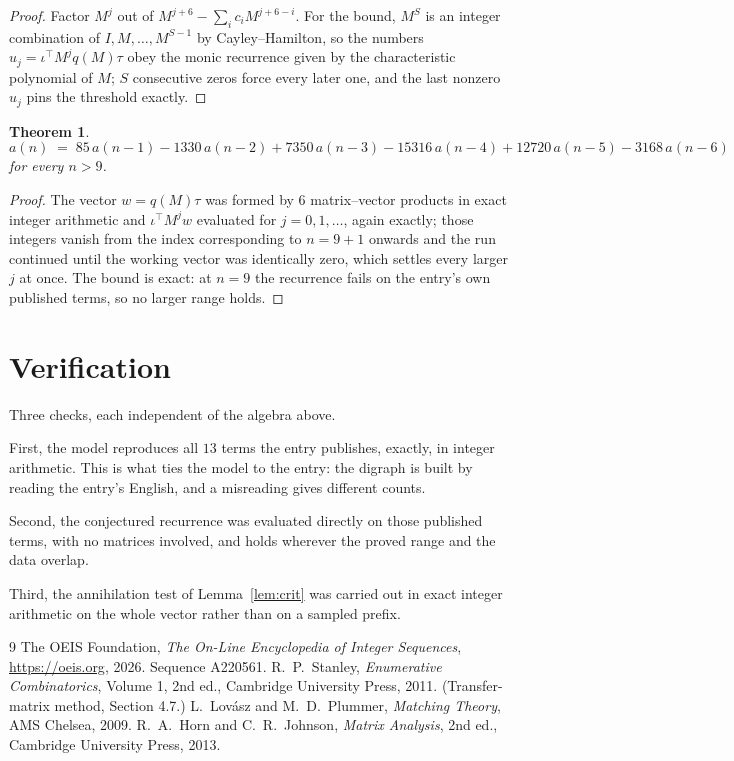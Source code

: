 \documentclass[11pt,a4paper]{article}
\theoremstyle{plain}
\newtheorem{theorem}{Theorem}
\theoremstyle{definition}
\begin{document}
\begin{proof}
Factor $M^{j}$ out of $M^{j+6}-\sum_ic_iM^{j+6-i}$. For the bound, $M^{S}$
is an integer combination of $I,M,\dots,M^{S-1}$ by Cayley--Hamilton, so the numbers
$u_j=\iota^{\!\top}M^{j}q(M)\tau$ obey the monic recurrence given by the characteristic
polynomial of $M$; $S$ consecutive zeros force every later one, and the last nonzero $u_j$
pins the threshold exactly.
\end{proof}

\begin{theorem}
\[
a(n)\;=\;85\,a(n-1) - 1330\,a(n-2) + 7350\,a(n-3) - 15316\,a(n-4) + 12720\,a(n-5) - 3168\,a(n-6)
\]
for every $n>9$.
\end{theorem}

\begin{proof}
The vector $w=q(M)\tau$ was formed by $6$ matrix--vector products in exact integer
arithmetic and $\iota^{\!\top}M^{j}w$ evaluated for $j=0,1,\dots$, again exactly; those
integers vanish from the index corresponding to $n=9+1$ onwards and the run continued
until the working vector was identically zero, which settles every larger $j$ at once. The bound is exact: at $n=9$ the recurrence fails on the entry's own published terms, so no larger range holds.
\end{proof}

\section{Verification}

Three checks, each independent of the algebra above.

First, the model reproduces all $13$ terms the entry publishes, exactly, in integer
arithmetic. This is what ties the model to the entry: the digraph is built by reading the
entry's English, and a misreading gives different counts.

Second, the conjectured recurrence was evaluated directly on those published terms, with no
matrices involved, and holds wherever the proved range and the data overlap.

Third, the annihilation test of Lemma~\ref{lem:crit} was carried out in exact integer
arithmetic on the whole vector rather than on a sampled prefix.

\begin{thebibliography}{9}
 The OEIS Foundation, \emph{The On-Line Encyclopedia of Integer
Sequences}, \url{https://oeis.org}, 2026. Sequence A220561.
 R.~P.~Stanley, \emph{Enumerative Combinatorics}, Volume 1, 2nd ed.,
Cambridge University Press, 2011. (Transfer-matrix method, Section 4.7.)
 L.~Lov\'asz and M.~D.~Plummer, \emph{Matching Theory}, AMS Chelsea,
2009.
 R.~A.~Horn and C.~R.~Johnson, \emph{Matrix Analysis}, 2nd ed., Cambridge
University Press, 2013.
\end{thebibliography}
\end{document}

